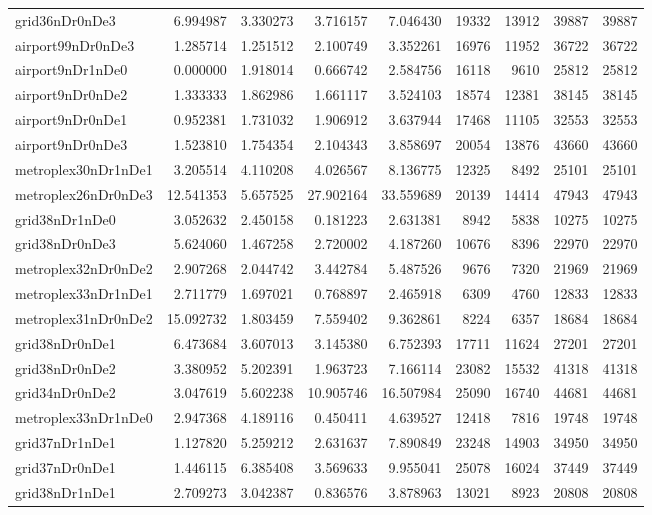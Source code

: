 \begin{longtable}{|l|r|r|r|r|r|r|r|r|}
grid36nDr0nDe3 & 6.994987 & 3.330273 & 3.716157 & 7.046430 & 19332 & 13912 & 39887 & 39887 \\
airport99nDr0nDe3 & 1.285714 & 1.251512 & 2.100749 & 3.352261 & 16976 & 11952 & 36722 & 36722 \\
airport9nDr1nDe0 & 0.000000 & 1.918014 & 0.666742 & 2.584756 & 16118 & 9610 & 25812 & 25812 \\
airport9nDr0nDe2 & 1.333333 & 1.862986 & 1.661117 & 3.524103 & 18574 & 12381 & 38145 & 38145 \\
airport9nDr0nDe1 & 0.952381 & 1.731032 & 1.906912 & 3.637944 & 17468 & 11105 & 32553 & 32553 \\
airport9nDr0nDe3 & 1.523810 & 1.754354 & 2.104343 & 3.858697 & 20054 & 13876 & 43660 & 43660 \\
metroplex30nDr1nDe1 & 3.205514 & 4.110208 & 4.026567 & 8.136775 & 12325 & 8492 & 25101 & 25101 \\
metroplex26nDr0nDe3 & 12.541353 & 5.657525 & 27.902164 & 33.559689 & 20139 & 14414 & 47943 & 47943 \\
grid38nDr1nDe0 & 3.052632 & 2.450158 & 0.181223 & 2.631381 & 8942 & 5838 & 10275 & 10275 \\
grid38nDr0nDe3 & 5.624060 & 1.467258 & 2.720002 & 4.187260 & 10676 & 8396 & 22970 & 22970 \\
metroplex32nDr0nDe2 & 2.907268 & 2.044742 & 3.442784 & 5.487526 & 9676 & 7320 & 21969 & 21969 \\
metroplex33nDr1nDe1 & 2.711779 & 1.697021 & 0.768897 & 2.465918 & 6309 & 4760 & 12833 & 12833 \\
metroplex31nDr0nDe2 & 15.092732 & 1.803459 & 7.559402 & 9.362861 & 8224 & 6357 & 18684 & 18684 \\
grid38nDr0nDe1 & 6.473684 & 3.607013 & 3.145380 & 6.752393 & 17711 & 11624 & 27201 & 27201 \\
grid38nDr0nDe2 & 3.380952 & 5.202391 & 1.963723 & 7.166114 & 23082 & 15532 & 41318 & 41318 \\
grid34nDr0nDe2 & 3.047619 & 5.602238 & 10.905746 & 16.507984 & 25090 & 16740 & 44681 & 44681 \\
metroplex33nDr1nDe0 & 2.947368 & 4.189116 & 0.450411 & 4.639527 & 12418 & 7816 & 19748 & 19748 \\
grid37nDr1nDe1 & 1.127820 & 5.259212 & 2.631637 & 7.890849 & 23248 & 14903 & 34950 & 34950 \\
grid37nDr0nDe1 & 1.446115 & 6.385408 & 3.569633 & 9.955041 & 25078 & 16024 & 37449 & 37449 \\
grid38nDr1nDe1 & 2.709273 & 3.042387 & 0.836576 & 3.878963 & 13021 & 8923 & 20808 & 20808 \\

\end{longtable}

